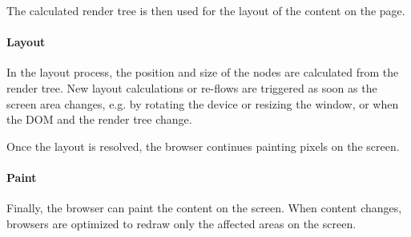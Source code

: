 The calculated render tree is then used for the layout of the content on the page.





\paragraph{Layout} %

In the layout process, the position and size of the nodes are calculated from the render tree.
New layout calculations or re-flows are triggered as soon as the screen area changes, e.g. by rotating the device or resizing the window, or when the DOM and the render tree change. %

Once the layout is resolved, the browser continues painting pixels on the screen.








\paragraph{Paint} %

Finally, the browser can paint the content on the screen.
When content changes, browsers are optimized to redraw only the affected areas on the screen. %




